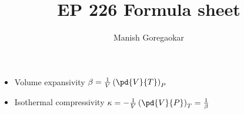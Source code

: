 \documentclass[10pt]{article}
\title{EP 226 Formula sheet}
\author{Manish Goregaokar}
\begin{document}
\maketitle
\begin{itemize}
\item Volume expansivity $\beta=\frac1{V}\left(\pd{V}{T}\right)_P$
\item Isothermal compressivity $\kappa=-\frac1{V}\left(\pd{V}{P}\right)_T=\frac1\beta$
\end{itemize}
\end{document}
